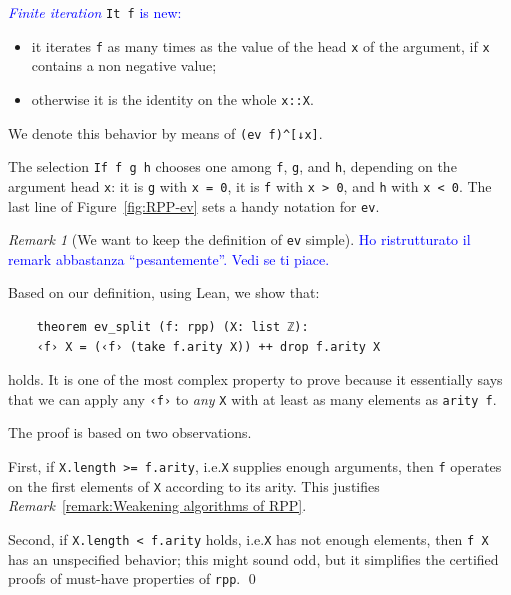 \documentclass[preprint]{elsarticle}
\theoremstyle{remark}
\newtheorem{remark}{Remark}
\newcommand{\LEAN}{\textsf{Lean}\xspace}
\begin{document}
\vspace{\baselineskip}
\noindent
\textcolor{blue}{\emph{Finite iteration}} \lstinline|It f| \textcolor{blue}{is new:}
\begin{itemize}
    \item it iterates \lstinline|f| as many times as the value of the head \lstinline|x| of the argument, if \lstinline|x| contains a non negative value;
    \item otherwise it is the identity on the whole \lstinline|x::X|.
\end{itemize}
We denote this behavior by means of \lstinline|(ev f)^[↓x]|.

\vspace{\baselineskip}
\noindent
The selection \lstinline|If f g h| chooses one among \lstinline|f|, \lstinline|g|, and \lstinline|h|, depending on the argument head \lstinline|x|: it is \lstinline|g| with \lstinline|x = 0|, it is \lstinline|f| with \lstinline|x > 0|, and \lstinline|h| with \lstinline|x < 0|.
The last line of Figure~\ref{fig:RPP-ev} sets a handy notation for \lstinline|ev|.

\begin{remark}[We want to keep the definition of \texttt{ev} simple]
\label{remark:We keep the definition of ev simple}
\textcolor{blue}{Ho ristrutturato il remark abbastanza ``pesantemente''. Vedi se ti piace.}

Based on our definition, using \LEAN, we show that:
\begin{lstlisting}
    theorem ev_split (f: rpp) (X: list ℤ):
    ‹f› X = (‹f› (take f.arity X)) ++ drop f.arity X
\end{lstlisting}
holds. It is one of the most complex property to prove because it essentially says that we can apply any \lstinline|‹f›| to \emph{any} \lstinline|X| with at least as many elements as \lstinline|arity f|.

The proof is based on two observations.

First, if \lstinline|X.length >= f.arity|, i.e.\@ \lstinline|X| supplies enough arguments, then \lstinline|f| operates on the first elements of \lstinline|X| according to its arity. This justifies \textit{Remark}~\ref{remark:Weakening algorithms of RPP}.

Second, if \lstinline|X.length < f.arity| holds, i.e.\@ \lstinline|X| has not enough elements, then \lstinline|f X| has an unspecified behavior; this might sound odd, but it simplifies the certified proofs of must-have properties of \lstinline|rpp|.
\qed
\end{remark}
\end{document}
